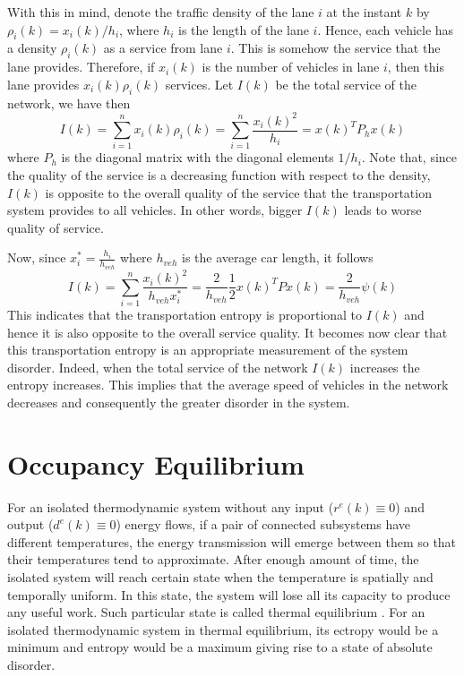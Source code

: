 \documentclass[trsc,nonblindrev]{informs3} %
\renewcommand{\vec}[1]{#1}
\newcommand{\mat}[1]{#1}
\begin{document}
With this in mind, denote the traffic density of the lane $i$ at the
instant $k$ by $\rho_i(k)=x_i(k)/h_i$, where $h_i$ is the length of
the lane $i$. Hence, each vehicle has a density $\rho_i(k)$ as a
service from lane $i$. This is somehow the service that the lane 
provides. Therefore, if $x_i(k)$ is the number of vehicles in lane
$i$, then this lane provides $x_i(k)\rho_i(k)$ services.
Let $I(k)$ be the total service of the network, we have then
\begin{equation}
\label{equ:quality_service}
I(k)=\sum_{i=1}^{n} x_i(k)\rho_i(k)
=\sum_{i=1}^{n}\frac{x_i(k)^2}{h_i}
=\vec{x}(k)^T\mat{P}_h\vec{x}(k)
\end{equation}
where $\mat{P}_h$ is the diagonal matrix with the diagonal elements
$1/h_i$. Note that, since the quality of the service is a decreasing 
function with respect to the density, $I(k)$ is opposite to the
overall quality of the service that the transportation system provides
to all vehicles. In other words, bigger $I(k)$ leads to worse quality of  service.

Now, since $x_i^*=\frac{h_i}{h_{veh}}$ where $h_{veh}$ is the average
car length, it follows
\begin{equation}
I(k) = \sum_{i=1}^{n}\frac{x_i(k)^2}{h_{veh} x_i^*}
= \frac{2}{h_{veh}} \frac{1}{2}\vec{x}(k)^T\mat{P}\vec{x}(k)
= \frac{2}{h_{veh}} \psi(k)
\end{equation}
This indicates that the transportation entropy is proportional to
$I(k)$ and hence it is also opposite to the overall service quality. It
becomes now clear that this transportation entropy is an appropriate
measurement of the system disorder. Indeed, when the total service of
the network  $I(k)$ increases the entropy increases. This
implies that the average speed of vehicles in the network decreases and consequently the
greater disorder in the system.

\section{Occupancy Equilibrium}\label{sec:equilibrium}

For an isolated thermodynamic system without any input
($\vec{r}^e(k)\equiv 0$) and output ($\vec{d}^e(k)\equiv 0$) energy
flows, if a pair of connected subsystems have different temperatures,
the energy transmission will emerge between them so that their
temperatures tend to approximate. After enough amount of time, the
isolated system will reach certain state when the temperature is
spatially and temporally uniform. In this state, the system will lose
all its capacity to produce any useful work. Such particular state is
called thermal equilibrium \citep{cengel_thermodynamics:_2001}. For
an isolated thermodynamic system in thermal equilibrium, its ectropy
would be a minimum and entropy would be a maximum giving rise to a
state of absolute disorder.
\end{document}

